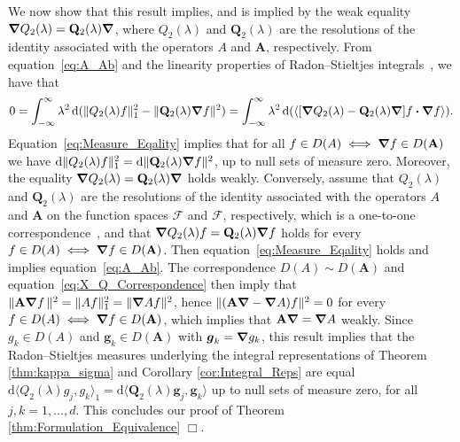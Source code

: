 \documentclass[leqno,onefignum,onetabnum]{siamltex1213}
\renewcommand{\d}{\mathrm{d}}
\newcommand{\Ab}{\mathbf{A}}
\newcommand{\Qb}{\mathbf{Q}}
\newcommand{\Fc}{\mathcal{F}}
\newcommand{\Fs}{\mathscr{F}}
\newcommand\bnabla{\mbox{\boldmath${\nabla}$}}
\providecommand\bcdot{\boldsymbol{\cdot}}
\newcommand{\vecg}{\boldsymbol{g}}
\begin{document}
We now show that this result implies, and is implied by the weak
equality $\bnabla Q_2(\lambda)=\Qb_2(\lambda)\bnabla $, where
$Q_2(\lambda)$ and $\Qb_2(\lambda)$ are the resolutions of the identity associated
with the operators $A$ and $\Ab$, respectively. From
equation~\eqref{eq:A_Ab} and the linearity properties of
Radon--Stieltjes integrals~\cite{Stone:64}, we have that   
%
\begin{align}\label{eq:Measure_Eqality}
  0=\int_{-\infty}^\infty\lambda^2\,\d(\|Q_2(\lambda)f\|_1^2-\|\Qb_2(\lambda)\bnabla f\|^2)
   =\int_{-\infty}^\infty\lambda^2\,\d(\langle[\bnabla Q_2(\lambda)-\Qb_2(\lambda)\bnabla ]f\bcdot\bnabla f\rangle).
\end{align}
%
Equation~\eqref{eq:Measure_Eqality} implies that for all
$f\in D(A)\iff\bnabla f\in D(\Ab)$ we have
$\d\|Q_2(\lambda)f\|_1^2=\d\|\Qb_2(\lambda)\bnabla f\|^2$, up to null sets of measure
zero. Moreover, the equality $\bnabla Q_2(\lambda)=\Qb_2(\lambda)\bnabla $ holds
weakly. Conversely, assume that $Q_2(\lambda)$ and 
$\Qb_2(\lambda)$ are the resolutions of the identity associated with the
operators $A$ and $\Ab$ on the function spaces $\Fs$ and $\Fc$,
respectively, which is a one-to-one correspondence~\cite{Stone:64},
and that $\bnabla Q_2(\lambda)f=\Qb_2(\lambda)\bnabla f$ 
holds for every $f\in D(A)\iff\bnabla f\in D(\Ab)$. Then
equation~\eqref{eq:Measure_Eqality} holds and implies
equation~\eqref{eq:A_Ab}. The correspondence $D(A)\sim D(\Ab)$ and
equation~\eqref{eq:X_Q_Correspondence} then imply that
$\|\Ab\bnabla f\,\|^2=\|Af\|_1^2=\|\bnabla Af\|^2$, hence
$\|(\Ab\bnabla -\bnabla A)f\|^2=0$ for every $f\in D(A)\iff\bnabla f\in D(\Ab)$,
which implies that $\Ab\bnabla =\bnabla A$ weakly. Since $g_k\in D(A)$ and
$\vecg_k\in D(\Ab)$ with $\vecg_k=\bnabla g_k$, this result implies
that the Radon--Stieltjes measures underlying the integral
representations of Theorem \ref{thm:kappa_sigma} and Corollary
\ref{cor:Integral_Reps} are equal
$\d\langle Q_2(\lambda)g_j,g_k\rangle_1=\d\langle\Qb_2(\lambda)\vecg_j,\vecg_k\rangle$ up to null sets
of measure zero, for all $j,k=1,\ldots,d$. This concludes our proof of
Theorem \ref{thm:Formulation_Equivalence} $\Box$.    
\end{document}
